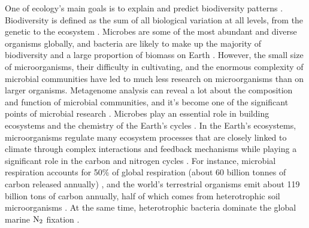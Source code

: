 \documentclass[11pt, a4paper]{article}
\begin{document}
\begin{spacing}{1.5}
One of ecology's main goals is to explain and predict biodiversity patterns \citep{mcgill2010towards}. Biodiversity is defined as the sum of all biological variation at all levels, from the genetic to the ecosystem \citep{purvis2000getting}. Microbes are some of the most abundant and diverse organisms globally, and bacteria are likely to make up the majority of biodiversity and a large proportion of biomass on Earth \citep{bar2018biomass}. However, the small size of microorganisms, their difficulty in cultivating, and the enormous complexity of microbial communities have led to much less research on microorganisms than on larger organisms. Metagenome analysis can reveal a lot about the composition and function of microbial communities, and it's become one of the significant points of microbial research \citep{mitchell2018ebi}. Microbes play an essential role in building ecosystems and the chemistry of the Earth's cycles \citep{azam1998microbial}. In the Earth's ecosystems, microorganisms regulate many ecosystem processes that are closely linked to climate through complex interactions and feedback mechanisms \citep{azam2007microbial, falkowski2008microbial} while playing a significant role in the carbon \citep{singh2010microorganisms} and nitrogen cycles \citep{kuypers2018microbial}. For instance, microbial respiration accounts for 50$\%$ of global respiration (about 60 billion tonnes of carbon released annually) \citep{hutchins2019climate}, and the world's terrestrial organisms emit about 119 billion tons of carbon annually, half of which comes from heterotrophic soil microorganisms \citep{reay2007greenhouse}. At the same time, heterotrophic bacteria dominate the global marine ${\rm N_{2}}$ fixation \citep{halm2012heterotrophic}. 


\end{spacing}
\end{document}
